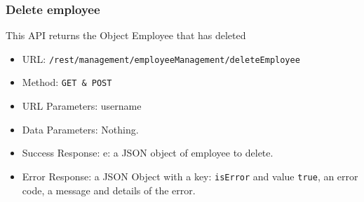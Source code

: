 \subsubsection*{Delete employee}
This API returns the Object Employee that has deleted
\begin{itemize}
    \item URL: \texttt{/rest/management/employeeManagement/deleteEmployee}
    \item Method: \texttt{{GET \& POST}}
    \item URL Parameters: username
    \item Data Parameters: Nothing.
    \item Success Response: e: a JSON object of employee to delete.
    \item Error Response: a JSON Object with a key: \texttt{isError}  and value \texttt{true}, an error code, a message and details of the error.
\end{itemize}